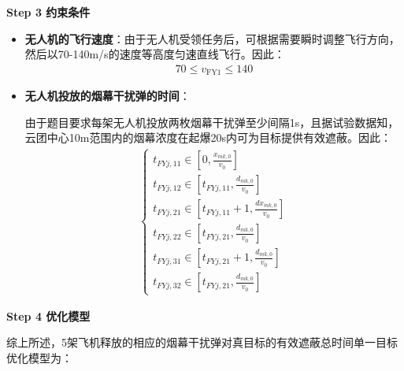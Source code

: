 \documentclass[../main.tex]{subfiles}
\begin{document}
\textbf{Step 3 约束条件}
\begin{itemize}
\item \textbf{无人机的飞行速度}：由于无人机受领任务后，可根据需要瞬时调整飞行方向，然后以70-140m/s的速度等高度匀速直线飞行。因此：
\begin{align}\label{11.8}
  70 \leq v_{\text{FY1}} \leq 140
\end{align}
\item \textbf{无人机投放的烟幕干扰弹的时间}：
\par 由于题目要求每架无人机投放两枚烟幕干扰弹至少间隔1s，且据试验数据知，云团中心10m范围内的烟幕浓度在起爆20s内可为目标提供有效遮蔽。因此：
\begin{align}\label{12345}
\left\{ \begin{array}{l}
	t_{FYj,11}\in \left[ 0, \frac{x_{mk,0}}{v_0} \right]
	\\
	t_{FYj,12}\in \left[ t_{FYj,11}, \frac{d_{mk,0}}{v_0} \right]
	\\
	t_{FYj,21}\in \left[ t_{FYj,11}+1, \frac{dx_{mk,0}}{v_0} \right]
	\\
	t_{FYj,22}\in \left[ t_{FYj,21}, \frac{d_{mk,0}}{v_0} \right]
	\\
	t_{FYj,31}\in \left[ t_{FYj,21}+1, \frac{d_{mk,0}}{v_0} \right]
	\\
	t_{FYj,32}\in \left[ t_{FYj,21}, \frac{d_{mk,0}}{v_0} \right]
\end{array} \right. 
\end{align}
\end{itemize}
\textbf{Step 4 优化模型}
\par 综上所述，5架飞机释放的相应的烟幕干扰弹对真目标的有效遮蔽总时间单一目标优化模型为：
\end{document}
